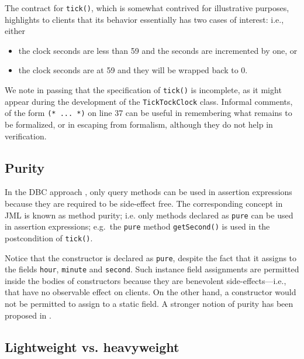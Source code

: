 \documentclass{llncs}
\begin{document}
The contract for \texttt{tick()},
which is somewhat contrived for illustrative purposes,
highlights to clients that its behavior 
essentially has two cases of interest: i.e., either 
\begin{itemize}
  \item the clock seconds are less than 59 and the seconds are incremented by one,
    or
  \item the clock seconds are at 59 and they will be wrapped back to 0.
\end{itemize}
%
We note in passing that the specification of \texttt{tick()} is incomplete, as
it might appear during the development of the \texttt{TickTockClock} class.
Informal comments, of the form \texttt{(* ... *)} on line 37 can be useful in
remembering what remains to be formalized, or in escaping from
formalism, although they do not help in verification. 

\subsection{Purity}
%
In the DBC approach \cite{Meyer97}, only query methods can be used in assertion
expressions because they are required to be side-effect free.
% 
The corresponding concept in JML is known as method purity; i.e. only methods
declared as \texttt{pure} can be used in assertion expressions; e.g.\ the
\texttt{pure} method \texttt{getSecond()} is used in the postcondition of
\texttt{tick()}.
%

Notice that the constructor is declared as \texttt{pure}, despite the fact 
that it assigns to the fields \texttt{hour}, \texttt{minute} and \texttt{second}.
Such instance field assignments are permitted inside the bodies of constructors
because they are benevolent side-effects---i.e., that have no observable effect
on clients.
%
On the other hand, a constructor would not be permitted to assign to a static
field.
%
A stronger notion of purity has been proposed in \cite{DarvasMuller05}.

\subsection{Lightweight vs. heavyweight}
\end{document}
